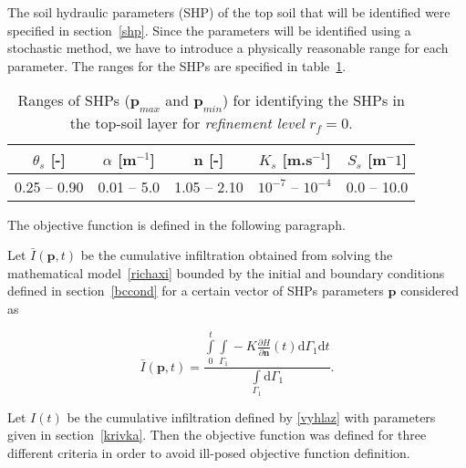 \documentclass[review]{myarticle}
\newenvironment{lineq}
    {\begin{linenomath*}
    \begin{equation}
    }
    { 
    \end{equation} 
    \end{linenomath*}
    }
\newcommand{\dd}{\mathrm{d}}
\renewcommand{\vec}{\mathbf}
\begin{document}
The soil hydraulic parameters (SHP) of the top soil that will be identified were specified in section~\ref{shp}.
Since the parameters will be identified using a stochastic method, we have to introduce a physically reasonable range for each parameter. The ranges for the SHPs are specified in table~\ref{rozsahy}.

\begin{table}[ht]
\begin{center}
\caption{Ranges of SHPs ($\vec{p}_{max}$ and $\vec{p}_{min}$) for identifying the SHPs in the top-soil layer for {\it refinement level} $r_f=0$.}
\begin{small}
\doublespacing
\begin{tabular}{c c c c c}
\toprule
$\theta_s$ [-]&$\alpha$ [m$^{-1}$]&n [-]& $K_s$ [m.s$^{-1}$] & $S_s$ [m$^-1$] \\ \hline
\toprule
0.25 -- 0.90 & 0.01 -- 5.0 & 1.05 -- 2.10 & $10^{-7}$ -- $10^{-4}$ & 0.0 -- 10.0 \\
\toprule
\end{tabular}
\end{small}
\label{rozsahy}
\end{center}
\end{table}

The objective function is defined in the following paragraph.


Let $\bar{I}(\vec{p},t)$ be the cumulative infiltration obtained from solving the mathematical model~\eqref{richaxi} bounded by the initial and boundary conditions  defined in section~\ref{bccond} for a certain vector of SHPs parameters $\vec{p}$ considered as
\begin{lineq}\bar{I}(\vec{p},t) = \frac{\int\limits_0^t \int\limits_{\Gamma_1}-K \frac{\partial H}{\partial \vec{n}}(t)  \dd \Gamma_1 \dd t}{\int\limits_{\Gamma_1} \dd \Gamma_1}.\end{lineq}
Let $I(t)$ be the cumulative infiltration defined by \eqref{vyhlaz} with parameters given in section~\ref{krivka}. 
Then the objective function was defined for three different criteria in order to avoid ill-posed objective function definition.
\end{document}

